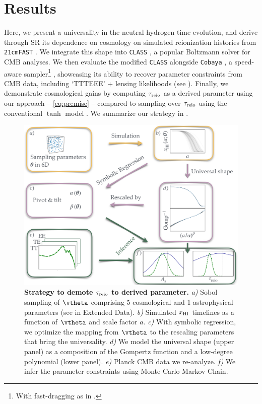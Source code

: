 \section*{Results}

Here, we present a universality in the neutral hydrogen time evolution,
and derive through SR its dependence on cosmology on simulated
reionization histories from \texttt{21cmFAST} \cite{Murray2020}.
We integrate this shape into \texttt{CLASS} \cite{Blas2011}, a popular
Boltzmann solver for CMB analyses.
We then evaluate the modified \texttt{CLASS} alongside \texttt{Cobaya}
\cite{Torrado2020}, a speed-aware sampler\footnote{With fast-dragging as
in \cite{Neal2005}.} \cite{Lewis2002, Lewis2013}, showcasing its ability to
recover parameter constraints from CMB data, including `TTTEEE' +
lensing likelihoods \cite{Planck2020c, Planck2020d} (see
).
Finally, we demonstrate cosmological gains by computing $\tau_{\mathrm{reio}}$ as
a derived parameter using our approach -- \cref{eq:premise} --
compared to sampling over $\tau_{\mathrm{reio}}$ using the conventional $\tanh$
model \cite{Lewis2008}.
We summarize our strategy in .

\begin{figure}
\centering
\includegraphics[width=\linewidth]{figs/big_fig.pdf}
\caption{\textbf{Strategy to demote $\tau_{\mathrm{reio}}$ to derived parameter.}
\emph{a)} Sobol sampling of $\vtheta$ comprising 5 cosmological and 1
astrophysical parameters (see  in Extended Data).
\emph{b)} Simulated $x_{\mathrm{HI}}$ timelines as a function of $\vtheta$ and
scale factor $a$.
\emph{c)} With symbolic regression, we optimize the mapping from
$\vtheta$ to the rescaling parameters that bring the universality.
\emph{d)} We model the universal shape (upper panel) as a composition of
the Gompertz function and a low-degree polynomial (lower panel).
\emph{e)} Planck CMB data we re-analyze.
\emph{f)} We infer the parameter constraints using Monte Carlo Markov
Chain.}
\label{fig:big}
\end{figure}

